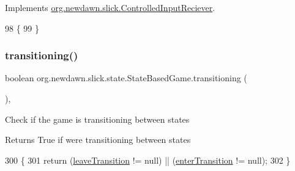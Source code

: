 Implements \mbox{\hyperlink{interfaceorg_1_1newdawn_1_1slick_1_1_controlled_input_reciever_ab838ca221a429b05c0b53aea9b4fe72f}{org.\+newdawn.\+slick.\+Controlled\+Input\+Reciever}}.


\begin{DoxyCode}
98                                       \{
99     \}
\end{DoxyCode}
\mbox{\label{classorg_1_1newdawn_1_1slick_1_1state_1_1_state_based_game_ae869c08778875776081935a090d4c92f}} 
\subsubsection{\texorpdfstring{transitioning()}{transitioning()}}
{\footnotesize\ttfamily boolean org.\+newdawn.\+slick.\+state.\+State\+Based\+Game.\+transitioning (\begin{DoxyParamCaption}{ }\end{DoxyParamCaption})\hspace{0.3cm}{\ttfamily [inline]}, {\ttfamily [private]}}

Check if the game is transitioning between states

\begin{DoxyReturn}{Returns}
True if we\textquotesingle{}re transitioning between states 
\end{DoxyReturn}

\begin{DoxyCode}
300                                     \{
301         \textcolor{keywordflow}{return} (\mbox{\hyperlink{classorg_1_1newdawn_1_1slick_1_1state_1_1_state_based_game_aa946e59415cf0a3ebbe6d4595c9bc0f1}{leaveTransition}} != null) || (\mbox{\hyperlink{classorg_1_1newdawn_1_1slick_1_1state_1_1_state_based_game_a85aa7a1bf06d60e2143e5ba002d9088a}{enterTransition}} != null);
302     \}
\end{DoxyCode}
\mbox{\label{classorg_1_1newdawn_1_1slick_1_1state_1_1_state_based_game_a14ceb4a8ffc0cb90f9b8f6de8aa5f42f}} 
